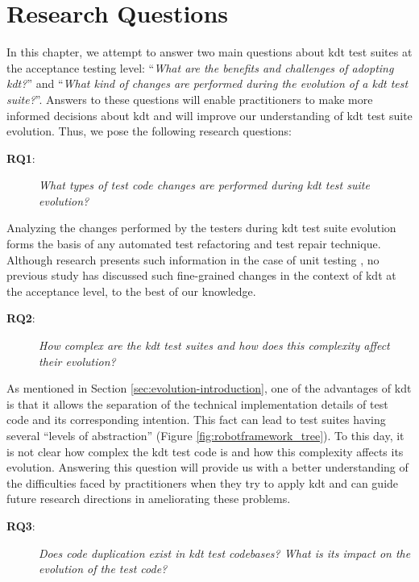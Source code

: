 \section{Research Questions}

In this chapter, we attempt to answer two main questions about \gls{kdt} test suites at the acceptance testing level: ``\emph{What are the benefits and challenges of adopting \gls{kdt}?}''  and ``\emph{What kind of changes are performed during the evolution of a \gls{kdt} test suite?}''. Answers to these questions will enable practitioners to make more informed decisions about \gls{kdt} and will improve our understanding of \gls{kdt} test suite evolution. Thus, we pose the following research questions:

\begin{description}
\item[\textbf{RQ1}:] \emph{What types of test code changes are performed during \gls{kdt} test suite evolution?}
\end{description}

Analyzing the changes performed by the testers during \gls{kdt} test suite evolution forms the basis of any automated test refactoring and test repair technique. Although research presents such information in the case of unit testing \cite{Pinto2012}, no previous study has discussed such fine-grained changes in the context of \gls{kdt} at the acceptance level, to the best of our
knowledge.

\begin{description}
\item[\textbf{RQ2}:] \emph{How complex are the \gls{kdt} test suites and how does this complexity affect their evolution?}
\end{description}

As mentioned in Section \ref{sec:evolution-introduction}, one of the advantages of \gls{kdt} is that it allows the separation of the technical implementation details of test code and its corresponding intention. This fact can lead to test suites having several ``levels of abstraction'' (Figure \ref{fig:robotframework_tree}). To this day, it is not clear how complex the \gls{kdt} test code is and how this complexity affects its evolution. Answering this question will provide us with a better understanding of the difficulties faced by practitioners when they try to apply \gls{kdt} and can guide future research directions in ameliorating these problems.

\begin{description}
\item[\textbf{RQ3}:] \emph{Does code duplication exist in \gls{kdt} test codebases? What is its impact on the evolution of the test code?}
\end{description}

